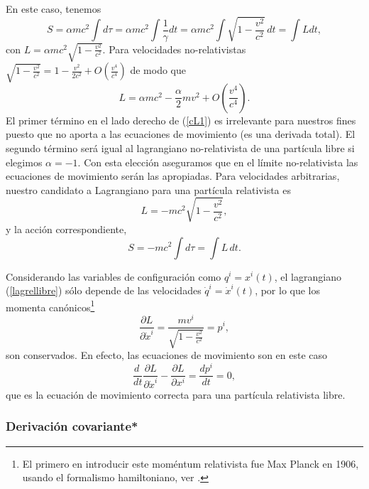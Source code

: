 En este caso, tenemos
\begin{equation}
S=\alpha mc^2\int  d\tau=\alpha mc^2\int \frac{1}{\gamma}dt=\alpha mc^2\int
\sqrt{1-\frac{v^2}{c^2}}\,dt=\int L dt, \label{lagrellibre0}
\end{equation}
con $L=\alpha mc^2 \sqrt{1-\frac{v^2}{c^2}}$.
Para velocidades no-relativistas $\sqrt{1-\frac{v^2}{c^2}}=1-\frac{v^2}{2c^2}+O(\frac{v^4}{c^4})$  de modo que
\begin{equation}
L=\alpha mc^2-\frac{\alpha}{2}mv^2+O(\frac{v^4}{c^4}). \label{cL1}
\end{equation}
El primer término en el lado derecho de (\ref{cL1}) es irrelevante para nuestros fines puesto que no aporta a las ecuaciones de movimiento (es una derivada total). El segundo término será igual al lagrangiano no-relativista de una partícula libre si elegimos $\alpha=-1$. Con esta elección aseguramos que en el límite no-relativista las ecuaciones de movimiento serán las apropiadas. Para velocidades arbitrarias, nuestro candidato a Lagrangiano para una partícula relativista es
\begin{equation}
L=-mc^2 \sqrt{1-\frac{v^2}{c^2}},\label{lagrellibre}
\end{equation}
y la acción correspondiente,
\begin{equation}
\boxed{S=- mc^2\int  d\tau=\int L\, dt.}
\end{equation}

Considerando las variables de configuración como $q^i=x^i(t)$, el lagrangiano (\ref{lagrellibre}) sólo depende de las velocidades $\dot{q}^i=\dot{x}^i(t)$, por lo que los momenta canónicos\footnote{El primero en introducir este moméntum relativista fue Max Planck en 1906, usando el formalismo hamiltoniano, ver \cite{Planck06}.}
\begin{equation}
\frac{\partial L}{\partial \dot{x}^i}=\frac{mv^i}{\sqrt{1-\frac{v^2}{c^2}}}=p^i,
\end{equation}
son conservados. En efecto, las ecuaciones de movimiento son en este caso
\begin{equation}
\frac{d\ }{dt}\frac{\partial L}{\partial \dot{x}^i}-\frac{\partial L}{\partial x^i}=\frac{d p^i}{dt} =0,
\end{equation}
que es la ecuación de movimiento correcta para una partícula relativista
libre.

\subsubsection{Derivación covariante*}

